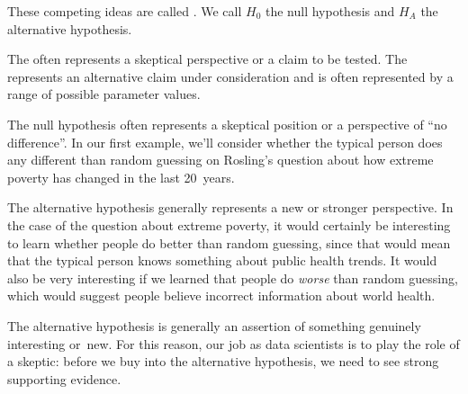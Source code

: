These competing ideas are called .
We call $H_0$ the null hypothesis and $H_A$ the alternative
hypothesis.

\begin{termBox}{
  The  often represents
  a skeptical perspective or a claim to be tested.
  The  represents an
  alternative claim under consideration and is often
  represented by a range of possible parameter values.}
\end{termBox}

The null hypothesis often represents a skeptical position
or a perspective of ``no difference''.
In our first example, we'll consider whether
the typical person does any different than random guessing
on Rosling's question about how extreme poverty has changed
in the last 20~years.

The alternative hypothesis generally represents a new
or stronger perspective. In the case of the question
about extreme poverty,
it would certainly be interesting to learn whether
people do better than random guessing, since that would
mean that the typical person knows something about
public health trends.
It would also be very interesting if we learned
that people do \emph{worse} than random guessing,
which would suggest people believe
incorrect information about world health.

\begin{tipBox}{
  The alternative hypothesis is generally an assertion of
  something genuinely interesting or~new.
  For this reason,
  our job as data scientists is to play the role of a skeptic:
  before we buy into the alternative hypothesis, we need to
  see strong supporting evidence.}
\end{tipBox}


